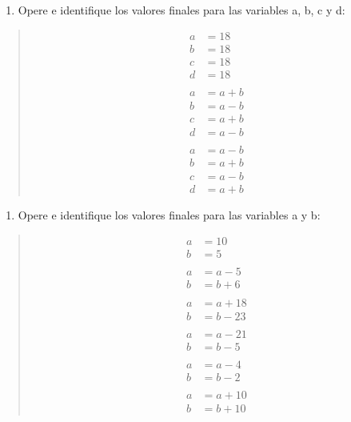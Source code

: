\documentclass[letterpaper,10pt,spanish]{sphinxmanual}
\begin{document}
\begin{enumerate}
%
\setcounter{enumi}{4}
\item {} 
\sphinxAtStartPar
Opere e identifique los valores finales para las variables a, b, c y d:

\end{enumerate}
\begin{quote}
\begin{equation*}
\begin{split}a &= 18
\\ b &= 18
\\ c &= 18
\\ d &= 18
\\
\\ a &= a + b
\\ b &= a - b
\\ c &= a + b
\\ d &= a - b
\\
\\ a &= a - b
\\ b &= a + b
\\ c &= a - b
\\ d &= a + b\end{split}
\end{equation*}\end{quote}
\begin{enumerate}
%
\setcounter{enumi}{5}
\item {} 
\sphinxAtStartPar
Opere e identifique los valores finales para las variables a y b:

\end{enumerate}
\begin{quote}
\begin{equation*}
\begin{split}a &= 10
\\ b &= 5
\\
\\ a &= a - 5
\\ b &= b + 6
\\
\\ a &= a + 18
\\ b &= b - 23
\\
\\ a &= a - 21
\\ b &= b - 5
\\
\\ a &= a - 4
\\ b &= b - 2
\\
\\ a &= a + 10
\\ b &= b + 10\end{split}
\end{equation*}\end{quote}
\end{document}
